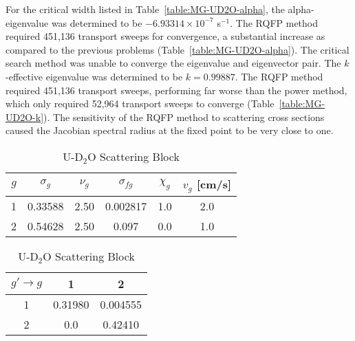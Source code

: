 For the critical width listed in Table~\ref{table:MG-UD2O-alpha}, the alpha-eigenvalue was determined to be $-6.93314 \times 10^{-7}$ s$^{-1}$. The RQFP method required 451,136 transport sweeps for convergence, a substantial increase as compared to the previous problems (Table~\ref{table:MG-UD2O-alpha}). The critical search method was unable to converge the eigenvalue and eigenvector pair. The $k$-effective eigenvalue was determined to be $k = 0.99887$. The RQFP method required 451,136 transport sweeps, performing far worse than the power method, which only required 52,964 transport sweeps to converge (Table~\ref{table:MG-UD2O-k}). The sensitivity of the RQFP method to scattering cross sections caused the Jacobian spectral radius at the fixed point to be very close to one.

\begin{table}[!htbp]
	\caption{Sood Criticality Benchmark Problem 68 Cross Sections (cm$^{-1}$) in \cite{sood2003analytical}}
	\label{table:D2O}
	\begin{subtable}[!htbp]{1.0\textwidth}
		\centering{}
		\begin{tabular}{@{}cccccc@{}}\toprule
			$g$ & $\sigma_{g} $ & $\nu_{g}$ & $\sigma_{fg}$ & $\chi_{g}$ & $v_{g}$ [cm/s] \\ 
        			\midrule
			1 & 0.33588  & 2.50 & 0.002817 & 1.0 & 2.0 \\
			2 & 0.54628  & 2.50 & 0.097 & 0.0 & 1.0 \\
			\bottomrule
		\end{tabular}
	\caption{U-D$_{2}$O Cross Sections}
	\label{table:TwoGroupUD2O}
	\end{subtable}%
	\vspace{0.25cm}
	\begin{subtable}[!htbp]{1.0\textwidth}
	\centering{}
	\begin{tabular}{@{}ccc@{}}\toprule
	$g' \rightarrow g$ & 1 & 2 \\ 
        \midrule
	1 & 0.31980   & 0.004555   \\
	2 & 0.0 & 0.42410  \\
	\bottomrule
	\end{tabular}
	\caption{U-D$_{2}$O Scattering Block}
	\label{table:TwoGroupUD2O_ScatterXS}
	\end{subtable}
\end{table}

